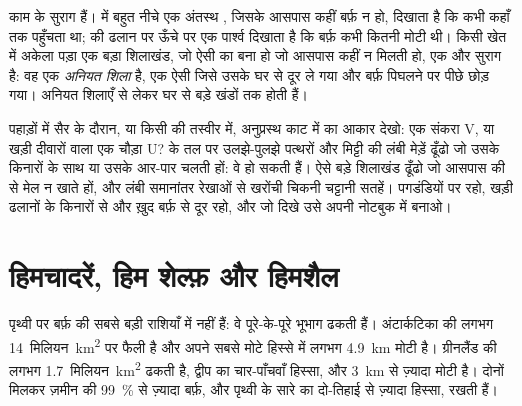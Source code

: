  काम के सुराग हैं।  में बहुत नीचे एक अंतस्थ , जिसके आसपास कहीं बर्फ़ न हो,
दिखाता है कि  कभी कहाँ तक पहुँचता था;  की ढलान पर ऊँचे पर एक पार्श्व 
दिखाता है कि बर्फ़ कभी कितनी मोटी थी। किसी खेत में अकेला पड़ा एक बड़ा शिलाखंड, जो ऐसी
 का बना हो जो आसपास कहीं न मिलती हो, एक और सुराग है: वह एक \emph{अनियत शिला}
है, एक ऐसी  जिसे  उसके घर से दूर ले गया और बर्फ़ पिघलने पर पीछे छोड़ गया।
अनियत शिलाएँ  से लेकर घर से बड़े खंडों तक होती
हैं।

\begin{inthefield}[बर्फ़ से आकार पाई घाटी पढ़ना]
पहाड़ों में सैर के दौरान, या किसी   की तस्वीर में, अनुप्रस्थ काट में  का
आकार देखो: एक संकरा V, या खड़ी दीवारों वाला एक चौड़ा U?  के तल पर उलझे-पुलझे
पत्थरों और मिट्टी की लंबी मेड़ें ढूँढो जो उसके किनारों के साथ या उसके आर-पार चलती हों:
वे  हो सकती हैं। ऐसे बड़े शिलाखंड ढूँढो जो आसपास की  से मेल न खाते हों, और
लंबी समानांतर रेखाओं से खरोंची चिकनी चट्टानी सतहें। पगडंडियों पर रहो, खड़ी ढलानों के
किनारों से और ख़ुद बर्फ़ से दूर रहो, और जो दिखे उसे अपनी नोटबुक में
बनाओ।
\end{inthefield}

\section{हिमचादरें, हिम शेल्फ़ और हिमशैल}

पृथ्वी पर बर्फ़ की सबसे बड़ी राशियाँ   में नहीं हैं: वे पूरे-के-पूरे भूभाग
ढकती हैं। अंटार्कटिका की  लगभग \num{14}~मिलियन~\unit{km^2} पर फैली है और अपने
सबसे मोटे हिस्से में लगभग \qty{4.9}{km} मोटी है। ग्रीनलैंड की  लगभग
\num{1.7}~मिलियन~\unit{km^2} ढकती है, द्वीप का चार-पाँचवाँ हिस्सा, और \qty{3}{km} से
ज़्यादा मोटी है। दोनों मिलकर ज़मीन की 99~\% से ज़्यादा बर्फ़, और पृथ्वी के सारे 
का दो-तिहाई से ज़्यादा हिस्सा, रखती
हैं।

